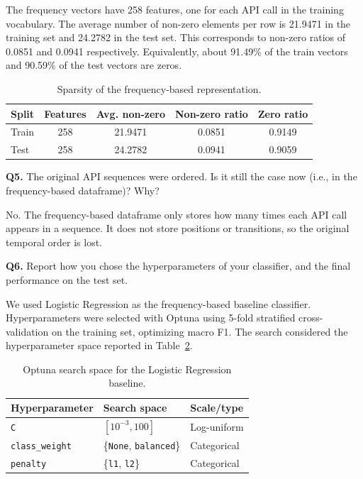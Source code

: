 The frequency vectors have 258 features, one for each API call in the training vocabulary.
The average number of non-zero elements per row is 21.9471 in the training set and 24.2782 in
the test set. This corresponds to non-zero ratios of 0.0851 and 0.0941 respectively.
Equivalently, about 91.49\% of the train vectors and 90.59\% of the test vectors are zeros.

\begin{table}[h!]
\centering
\begin{tabular}{lcccc}
\hline
\textbf{Split} & \textbf{Features} & \textbf{Avg. non-zero} & \textbf{Non-zero ratio} & \textbf{Zero ratio} \\
\hline
Train & 258 & 21.9471 & 0.0851 & 0.9149 \\
Test  & 258 & 24.2782 & 0.0941 & 0.9059 \\
\hline
\end{tabular}
\caption{Sparsity of the frequency-based representation.}
\label{tab:task1_sparsity}
\end{table}

\begin{questionbox}
\textbf{Q5.} The original API sequences were ordered. Is it still the case now (i.e., in the frequency-based dataframe)? Why?
\end{questionbox}

No. The frequency-based dataframe only stores how many times each API call appears in a sequence.
It does not store positions or transitions, so the original temporal order is lost.

\begin{questionbox}
\textbf{Q6.} Report how you chose the hyperparameters of your classifier, and the final performance on the test set.
\end{questionbox}

We used Logistic Regression as the frequency-based baseline classifier. Hyperparameters were selected
with Optuna using 5-fold stratified cross-validation on the training set, optimizing macro F1. The
search considered the hyperparameter space reported in Table~\ref{tab:task1_optuna_space}.

\begin{table}[h!]
\centering
\begin{tabular}{lll}
\hline
\textbf{Hyperparameter} & \textbf{Search space} & \textbf{Scale/type} \\
\hline
\texttt{C} & $[10^{-3}, 100]$ & Log-uniform \\
\texttt{class\_weight} & \{\texttt{None}, \texttt{balanced}\} & Categorical \\
\texttt{penalty} & \{\texttt{l1}, \texttt{l2}\} & Categorical \\
\hline
\end{tabular}
\caption{Optuna search space for the Logistic Regression baseline.}
\label{tab:task1_optuna_space}
\end{table}

